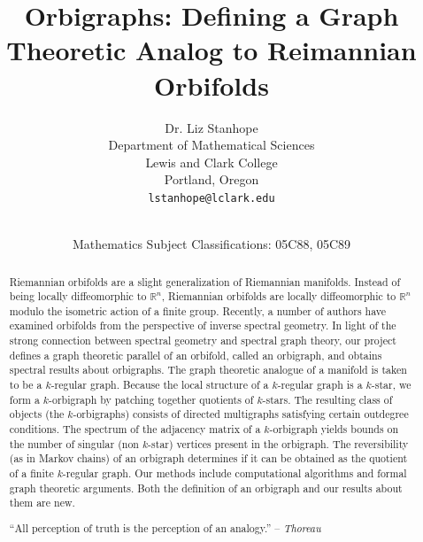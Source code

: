 \documentclass[12pt]{article}
\title{\bf Orbigraphs: Defining a Graph Theoretic Analog to Reimannian Orbifolds}
\author{Dr. Liz Stanhope\\
\small Department of Mathematical Sciences\\[-0.8ex]
\small Lewis and Clark College\\[-0.8ex] 
\small Portland, Oregon\\
\small\tt lstanhope@lclark.edu\\
}
\date{\dateline{July 29, 2013}{July 29, 2013}\\
\small Mathematics Subject Classifications: 05C88, 05C89}
\theoremstyle{plain}
\theoremstyle{definition}
\theoremstyle{remark}
\begin{document}
\maketitle


\begin{abstract}
Riemannian orbifolds are a slight generalization of Riemannian manifolds.  Instead of being locally diffeomorphic to $\mathbb{R}^n$, Riemannian orbifolds are locally diffeomorphic to $\mathbb{R}^n$ modulo the isometric action of a finite group.  Recently, a number of authors have examined orbifolds from the perspective of inverse spectral geometry.  In light of the strong connection between spectral geometry and spectral graph theory, our project defines a graph theoretic parallel of an orbifold, called an orbigraph, and obtains spectral results about orbigraphs.  The graph theoretic analogue of a manifold is taken to be a $k$-regular graph.  Because the local structure of a $k$-regular graph is a $k$-star, we form a $k$-orbigraph by patching together quotients of $k$-stars.  The resulting class of objects (the $k$-orbigraphs) consists of directed multigraphs satisfying certain outdegree conditions.  The spectrum of the adjacency matrix of a $k$-orbigraph yields bounds on the number of singular (non $k$-star) vertices present in the orbigraph.  The reversibility (as in Markov chains) of an orbigraph determines if it can be obtained as the quotient of a finite $k$-regular graph.  Our methods include computational algorithms and formal graph theoretic arguments.  Both the definition of an orbigraph and our results about them are new.

  \bigskip\noindent ``All perception of truth is the perception of an analogy.'' -- \textit{Thoreau}

\end{abstract}
\end{document}
